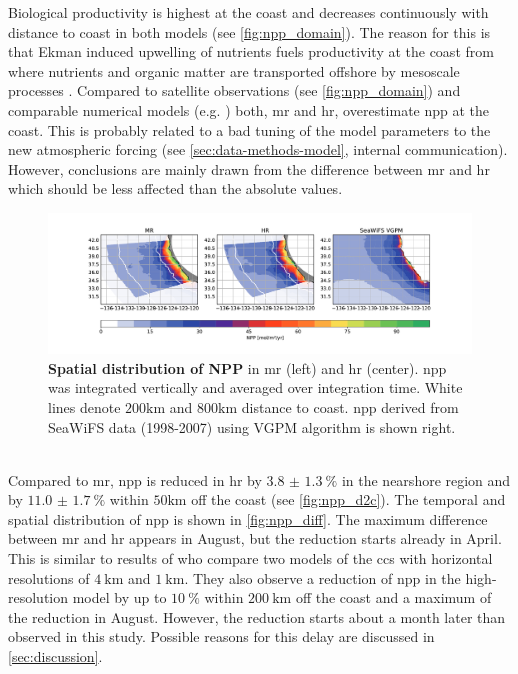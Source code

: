 Biological productivity is highest at the coast and decreases continuously with distance to coast in both models (see \autoref{fig:npp_domain}). The reason for this is that Ekman induced upwelling of nutrients fuels productivity at the coast from where nutrients and organic matter are transported offshore by mesoscale processes \autocite{nagai-2015-dom-role-meso}. Compared to satellite observations (see \autoref{fig:npp_domain}) and comparable numerical models (e.g. \textcite[see their Figure 5]{deutsch-2020-subm-modeldescr}) both, \ac{mr} and \ac{hr}, overestimate \ac{npp} at the coast. This is probably related to a bad tuning of the model parameters to the new atmospheric forcing (see \autoref{sec:data-methods-model}, internal communication). However, conclusions are mainly drawn from the difference between \ac{mr} and \ac{hr} which should be less affected than the absolute values.\\
\begin{figure}
    \centering
    \hspace*{0.2cm}\includegraphics[width=16cm, trim=3cm 0 0 0]{../figures/result_npp_domain.pdf}
    \caption[Spatial distribution of NPP]{\textbf{Spatial distribution of NPP} in \ac{mr} (left) and \ac{hr} (center). \ac{npp} was integrated vertically and averaged over integration time. White lines denote $200\si{\kilo\metre}$ and $800\si{\kilo\metre}$ distance to coast. \ac{npp} derived from SeaWiFS data (1998-2007) using VGPM algorithm \autocite{behrenfeld-1997-vgpm} is shown right.}
    \label{fig:npp_domain}
\end{figure}
\\
Compared to \ac{mr}, \ac{npp} is reduced in \ac{hr} by $\SI[separate-uncertainty]{3.8(13)}{\percent}$ in the nearshore region and by $\SI[separate-uncertainty]{11.0(17)}{\percent}$ within $50\si{\kilo\metre}$ off the coast (see \autoref{fig:npp_d2c}). The temporal and spatial distribution of \ac{npp} is shown in \autoref{fig:npp_diff}. The maximum difference between \ac{mr} and \ac{hr} appears in August, but the reduction starts already in April. This is similar to results of \textcite{kessouri-2020-seasonal-prod} who compare two models of the \ac{ccs} with horizontal resolutions of $\SI{4}{\kilo\metre}$ and $\SI{1}{\kilo\metre}$. They also observe a reduction of \ac{npp} in the high-resolution model by up to $\SI{10}{\percent}$ within $\SI{200}{\kilo\metre}$ off the coast and a maximum of the reduction in August. However, the reduction starts about a month later than observed in this study. Possible reasons for this delay are discussed in \autoref{sec:discussion}.\\
